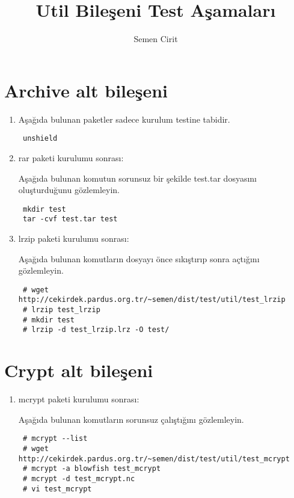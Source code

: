 \documentclass[a4paper,10pt]{article}
\title{Util Bileşeni Test Aşamaları}
\author{Semen Cirit}
\begin{document}
\maketitle
\section{Archive alt bileşeni}
\begin{enumerate}
\item Aşağıda bulunan paketler sadece kurulum testine tabidir.
\begin{verbatim}
 unshield
\end{verbatim}

\item rar paketi kurulumu sonrası:

Aşağıda bulunan komutun sorunsuz bir şekilde test.tar dosyasını oluşturduğunu gözlemleyin.
\begin{verbatim}
 mkdir test
 tar -cvf test.tar test
\end{verbatim}


 \item lrzip paketi kurulumu sonrası:

Aşağıda bulunan komutların dosyayı önce sıkıştırıp sonra açtığını gözlemleyin.
\begin{verbatim}
 # wget http://cekirdek.pardus.org.tr/~semen/dist/test/util/test_lrzip
 # lrzip test_lrzip
 # mkdir test
 # lrzip -d test_lrzip.lrz -O test/
\end{verbatim}


\end{enumerate}


\section{Crypt alt bileşeni}
\begin{enumerate}
 \item mcrypt paketi kurulumu sonrası:

Aşağıda bulunan komutların sorunsuz çalıştığını gözlemleyin.
\begin{verbatim}
 # mcrypt --list
 # wget http://cekirdek.pardus.org.tr/~semen/dist/test/util/test_mcrypt
 # mcrypt -a blowfish test_mcrypt
 # mcrypt -d test_mcrypt.nc
 # vi test_mcrypt
\end{verbatim}


\end{enumerate}
\end{document}
